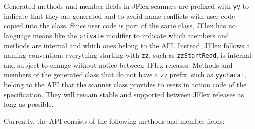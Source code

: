 Generated methods and member fields in JFlex scanners are prefixed with
\texttt{yy} to indicate that they are generated and to avoid name
conflicts with user code copied into the class. Since user code is part
of the same class, JFlex has no language means like the \texttt{private}
modifier to indicate which members and methods are internal and which
ones belong to the API. Instead, JFlex follows a naming convention:
everything starting with \texttt{zz}, such as \texttt{zzStartRead}, is
internal and subject to change without notice between JFlex releases.
Methods and members of the generated class that do not have a
\texttt{zz} prefix, such as \texttt{yycharat}, belong to the API that
the scanner class provides to users in action code of the specification.
They will remain stable and supported between JFlex releases as long as
possible.

Currently, the API consists of the following methods and member fields:

